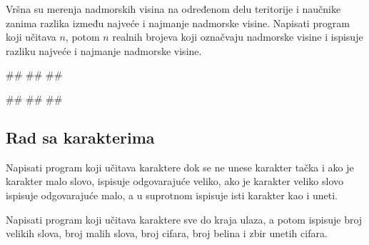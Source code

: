 \begin{Exercise}[label=p1.3_21] 
Vršna su merenja nadmorskih visina na određenom delu teritorije i
naučnike zanima razlika između najveće i najmanje nadmorske
visine. Napisati program koji učitava $n$, potom $n$ realnih brojeva
koji označvaju nadmorske visine i ispisuje razliku najveće i najmanje
nadmorske visine.

\begin{miditest}
\begin{upotreba}{1}
#\naslovInt#
##
##
\end{upotreba}
\end{miditest}
\begin{miditest}
\begin{upotreba}{2}
#\naslovInt#
##
##
\end{upotreba}
\end{miditest}
\end{Exercise}
\begin{Answer}[ref=p1.3_21]
\end{Answer}


\subsection{Rad sa karakterima}

\begin{Exercise}[label=v1.3_07] 
Napisati program koji učitava karaktere dok se ne unese karakter tačka
i ako je karakter malo slovo, ispisuje odgovarajuće veliko, ako je
karakter veliko slovo ispisuje odgovarajuće malo, a u suprotnom
ispisuje isti karakter kao i uneti.
\end{Exercise}
\begin{Answer}[ref=v1.3_07]
\end{Answer}

\begin{Exercise}[label=v1.3_08] 
Napisati program koji učitava karaktere sve do kraja ulaza, a
potom ispisuje broj velikih slova, broj malih slova, broj cifara, broj
belina i zbir unetih cifara.  
\end{Exercise}
\begin{Answer}[ref=v1.3_08]
\end{Answer}


